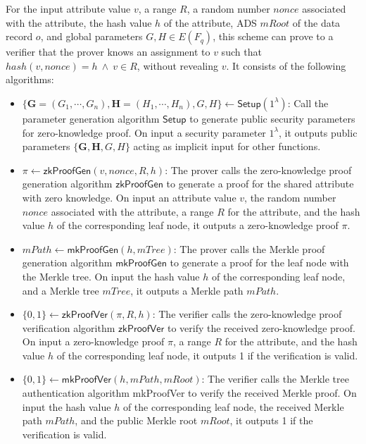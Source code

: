 \documentclass[11pt,divpdfm]{article}
\begin{document}
\begin{definition}
	For the input attribute value $v$, a range $R$, a random number $nonce$ associated with the attribute, the hash value $h$ of the attribute, ADS $mRoot$ of the data record $o$, and global parameters $G, H \in E(F_q)$, this scheme can prove to a verifier that the prover knows an assignment to $v$ such that $hash(v, nonce)=h ~ \wedge ~ v \in R$, without revealing $v$.
	It consists of the following algorithms:
	\begin{itemize}
		\item
		$\{\textbf{G}=(G_1, \cdots, G_n), \textbf{H}=(H_1, \cdots, H_n), G, H\} \leftarrow \textsf{Setup}(1^ \lambda)$:
		Call the parameter generation algorithm $\textsf{Setup}$ to generate public security parameters for zero-knowledge proof.
		On input a security parameter $1^ \lambda$, it outputs public parameters $\{\textbf{G}, \textbf{H}, G, H\}$ acting as implicit input for other functions.
		
		\item
		$\pi \leftarrow \textsf{zkProofGen}(v, nonce, R, h)$:
		The prover calls the zero-knowledge proof generation algorithm $\textsf{zkProofGen}$ to generate a proof for the shared attribute with zero knowledge.
		On input an attribute value $v$, the random number $nonce$ associated with the attribute, a range $R$ for the attribute, and the hash value $h$ of the corresponding leaf node, it outputs a zero-knowledge proof $\pi$.
		
		\item
		$mPath \leftarrow \textsf{mkProofGen}(h, mTree)$:
		The prover calls the Merkle proof generation algorithm $\textsf{mkProofGen}$ to generate a proof
		for the leaf node with the Merkle tree.
		On input the hash value $h$ of the corresponding leaf node, and a Merkle tree $mTree$, it outputs a Merkle path $mPath$.
		
		\item
		$\{0, 1\} \leftarrow \textsf{zkProofVer}(\pi, R, h)$:
		The verifier calls the zero-knowledge proof verification algorithm $\textsf{zkProofVer}$ to verify
		the received zero-knowledge proof.
		On input a zero-knowledge proof $\pi$, a range $R$ for the attribute, and the hash value $h$ of the corresponding leaf node, it outputs 1 if the verification is valid.
		
		\item
		$\{0, 1\} \leftarrow \textsf{mkProofVer}(h, mPath, mRoot)$:
		The verifier calls the Merkle tree authentication algorithm \textsf{mkProofVer} to verify the received Merkle proof.
		On input the hash value $h$ of the corresponding leaf node, the received Merkle path $mPath$, and the public Merkle root $mRoot$, it outputs 1 if the verification is valid.
	\end{itemize}
\end{definition}
\end{document}
